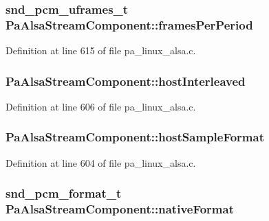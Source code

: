 \subsubsection[{\texorpdfstring{frames\+Per\+Period}{framesPerPeriod}}]{\setlength{\rightskip}{0pt plus 5cm}snd\+\_\+pcm\+\_\+uframes\+\_\+t Pa\+Alsa\+Stream\+Component\+::frames\+Per\+Period}\hypertarget{struct_pa_alsa_stream_component_adf73ee5aacd35d2068cf7b0316d8cec5}{}\label{struct_pa_alsa_stream_component_adf73ee5aacd35d2068cf7b0316d8cec5}


Definition at line 615 of file pa\+\_\+linux\+\_\+alsa.\+c.

\subsubsection[{\texorpdfstring{host\+Interleaved}{hostInterleaved}}]{ Pa\+Alsa\+Stream\+Component\+::host\+Interleaved}\hypertarget{struct_pa_alsa_stream_component_aaa329e397c4b1afd453a1652f572363c}{}\label{struct_pa_alsa_stream_component_aaa329e397c4b1afd453a1652f572363c}


Definition at line 606 of file pa\+\_\+linux\+\_\+alsa.\+c.

\subsubsection[{\texorpdfstring{host\+Sample\+Format}{hostSampleFormat}}]{ Pa\+Alsa\+Stream\+Component\+::host\+Sample\+Format}\hypertarget{struct_pa_alsa_stream_component_a1fc676cfdb28a43f9ee7d941b7ac94f8}{}\label{struct_pa_alsa_stream_component_a1fc676cfdb28a43f9ee7d941b7ac94f8}


Definition at line 604 of file pa\+\_\+linux\+\_\+alsa.\+c.

\subsubsection[{\texorpdfstring{native\+Format}{nativeFormat}}]{\setlength{\rightskip}{0pt plus 5cm}snd\+\_\+pcm\+\_\+format\+\_\+t Pa\+Alsa\+Stream\+Component\+::native\+Format}\hypertarget{struct_pa_alsa_stream_component_a3cc7e53dfa502ec320c1e870a9c02dd2}{}\label{struct_pa_alsa_stream_component_a3cc7e53dfa502ec320c1e870a9c02dd2}


